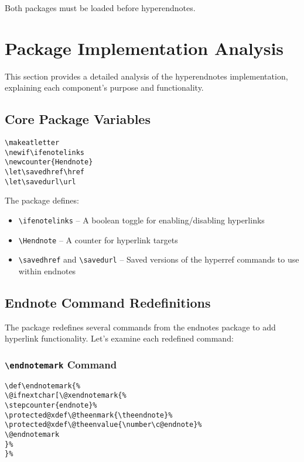 \documentclass[11pt]{article}
\newcommand{\pkg}[1]{\textsf{#1}}
\newcommand{\cmd}[1]{\texttt{\textbackslash#1}}
\begin{document}
Both packages must be loaded before \pkg{hyperendnotes}.

\section{Package Implementation Analysis}

This section provides a detailed analysis of the \pkg{hyperendnotes} implementation, explaining each component's purpose and functionality.

\subsection{Core Package Variables}

\begin{tcolorbox}[colback=gray!5, colframe=gray!75, title=Core Variables]
\begin{lstlisting}
\makeatletter
\newif\ifenotelinks
\newcounter{Hendnote}
\let\savedhref\href
\let\savedurl\url
\end{lstlisting}
\end{tcolorbox}

The package defines:
\begin{itemize}
  \item \cmd{ifenotelinks} -- A boolean toggle for enabling/disabling hyperlinks
  \item \cmd{Hendnote} -- A counter for hyperlink targets
  \item \cmd{savedhref} and \cmd{savedurl} -- Saved versions of the hyperref commands to use within endnotes
\end{itemize}

\subsection{Endnote Command Redefinitions}

The package redefines several commands from the \pkg{endnotes} package to add hyperlink functionality. Let's examine each redefined command:

\subsubsection{\cmd{endnotemark} Command}

\begin{tcolorbox}[colback=gray!5, colframe=gray!75, title=endnotemark Redefinition]
\begin{lstlisting}
\def\endnotemark{%
\@ifnextchar[\@xendnotemark{%
\stepcounter{endnote}%
\protected@xdef\@theenmark{\theendnote}%
\protected@xdef\@theenvalue{\number\c@endnote}%
\@endnotemark
}%
}%
\end{lstlisting}
\end{tcolorbox}
\end{document}
